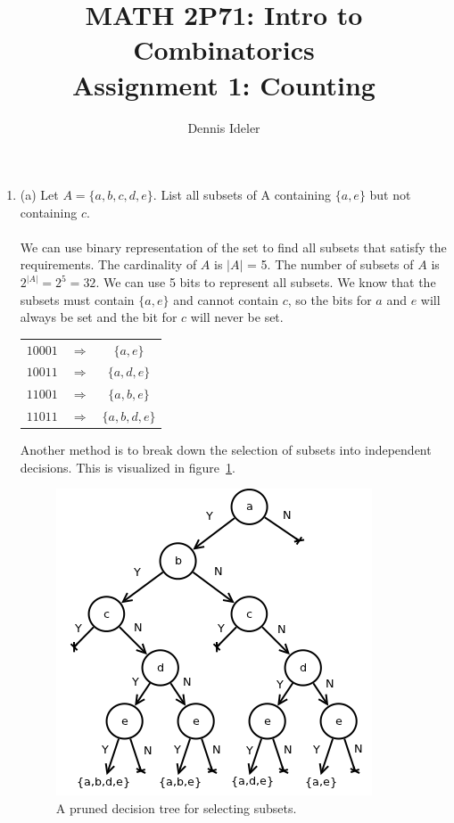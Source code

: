 \documentclass[10pt,a4paper,final]{article}
\author{Dennis Ideler}
\title{MATH 2P71: Intro to Combinatorics\\Assignment 1: Counting}
\begin{document}
\maketitle

\begin{enumerate}
\item %
(a) Let $A = \{a, b, c, d, e\}$.
List all subsets of A containing $\{a, e\}$ but not containing $c$.\\
\\
We can use binary representation of the set to find all subsets that satisfy the requirements.
The cardinality of $A$ is $|A|$ = 5. The number of subsets of $A$ is $2^{|A|} = 2^5 = 32$.
We can use 5 bits to represent all subsets.
We know that the subsets must contain $\{a,e\}$ and cannot contain $c$,
so the bits for $a$ and $e$ will always be set and the bit for $c$ will never be set.\\
\begin{tabular}{c c c}
$10001$ & $\Rightarrow$ & $\{a,e\}$\\
$10011$ & $\Rightarrow$ & $\{a,d,e\}$\\
$11001$ & $\Rightarrow$ & $\{a,b,e\}$\\
$11011$ & $\Rightarrow$ & $\{a,b,d,e\}$\\
\end{tabular}

Another method is to break down the selection of subsets into independent decisions.
This is visualized in figure~\ref{decisiontree}.\\
\begin{figure}[h!]
  \centering
    \includegraphics[scale=0.5]{1ab.png}
  \caption{A pruned decision tree for selecting subsets.}
  \label{decisiontree}
\end{figure}


\end{enumerate}
\end{document}
